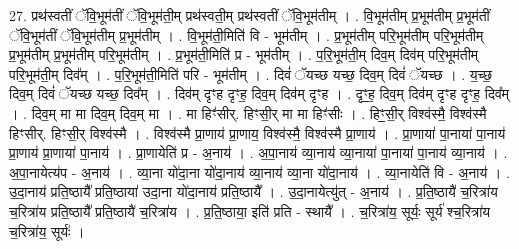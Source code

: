 \documentclass[17pt]{extarticle}
\begin{document}
27. प्रथ॑स्वतीं ॅवि॒भूम॑तीं ॅवि॒भूम॑ती॒म् प्रथ॑स्वती॒म् प्रथ॑स्वतीं ॅवि॒भूम॑तीम् । . वि॒भूम॑तीम् प्र॒भूम॑तीम् प्र॒भूम॑तीं ॅवि॒भूम॑तीं ॅवि॒भूम॑तीम् प्र॒भूम॑तीम् । . वि॒भूम॑ती॒मिति॑ वि - भूम॑तीम् । . प्र॒भूम॑तीम् परि॒भूम॑तीम् परि॒भूम॑तीम् प्र॒भूम॑तीम् प्र॒भूम॑तीम् परि॒भूम॑तीम् । . प्र॒भूम॑ती॒मिति॑ प्र - भूम॑तीम् । . प॒रि॒भूम॑ती॒म् दिव॒म् दिव॑म् परि॒भूम॑तीम् परि॒भूम॑ती॒म् दिव᳚म् । . प॒रि॒भूम॑ती॒मिति॑ परि - भूम॑तीम् । . दिवं॑ ॅयच्छ यच्छ॒ दिव॒म् दिवं॑ ॅयच्छ । . य॒च्छ॒ दिव॒म् दिवं॑ ॅयच्छ यच्छ॒ दिव᳚म् । . दिव॑म् दृꣳह दृꣳह॒ दिव॒म् दिव॑म् दृꣳह । . दृꣳ॒॒ह॒ दिव॒म् दिव॑म् दृꣳह दृꣳह॒ दिव᳚म् । . दिव॒म् मा मा दिव॒म् दिव॒म् मा । . मा हिꣳ॑सीर्. हिꣳसी॒र् मा मा हिꣳ॑सीः । . हिꣳ॒॒सी॒र् विश्व॑स्मै॒ विश्व॑स्मै हिꣳसीर्. हिꣳसी॒र् विश्व॑स्मै । . विश्व॑स्मै प्रा॒णाय॑ प्रा॒णाय॒ विश्व॑स्मै॒ विश्व॑स्मै प्रा॒णाय॑ । . प्रा॒णाया॑ पा॒नाया॑ पा॒नाय॑ प्रा॒णाय॑ प्रा॒णाया॑ पा॒नाय॑ । . प्रा॒णायेति॑ प्र - अ॒नाय॑ । . अ॒पा॒नाय॑ व्या॒नाय॑ व्या॒नाया॑ पा॒नाया॑ पा॒नाय॑ व्या॒नाय॑ । . अ॒पा॒नायेत्य॑प - अ॒नाय॑ । . व्या॒ना यो॑दा॒ना यो॑दा॒नाय॑ व्या॒नाय॑ व्या॒ना यो॑दा॒नाय॑ । . व्या॒नायेति॑ वि - अ॒नाय॑ । . उ॒दा॒नाय॑ प्रति॒ष्ठायै᳚ प्रति॒ष्ठाया॑ उदा॒ना यो॑दा॒नाय॑ प्रति॒ष्ठायै᳚ । . उ॒दा॒नायेत्यु॑त् - अ॒नाय॑ । . प्र॒ति॒ष्ठायै॑ च॒रित्रा॑य च॒रित्रा॑य प्रति॒ष्ठायै᳚ प्रति॒ष्ठायै॑ च॒रित्रा॑य । . प्र॒ति॒ष्ठाया॒ इति॑ प्रति - स्थायै᳚ । . च॒रित्रा॑य॒ सूर्यः॒ सूर्य॑ श्च॒रित्रा॑य च॒रित्रा॑य॒ सूर्यः॑ । \newline
\end{document}
